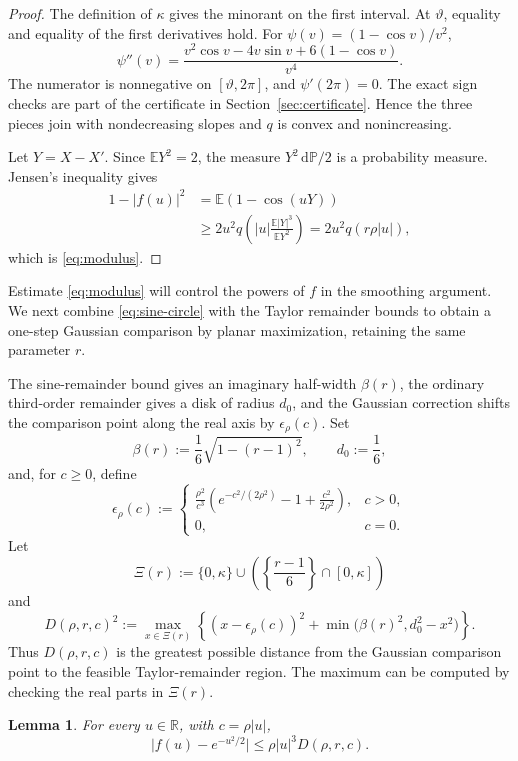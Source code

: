 \documentclass[11pt]{article}
\newtheorem{lemma}[theorem]{Lemma}
\newcommand{\E}{\mathbb E}
\newcommand{\Pp}{\mathbb P}
\newcommand{\R}{\mathbb R}
\newcommand{\dd}{\,\mathrm d}
\newcommand{\abs}[1]{\lvert#1\rvert}
\begin{document}
\begin{proof}
The definition of \(\kappa\) gives the minorant on the first interval.
At \(\vartheta\), equality and equality of the first derivatives hold.
For \(\psi(v)=(1-\cos v)/v^2\),
\[
 \psi''(v)=\frac{v^2\cos v-4v\sin v+6(1-\cos v)}{v^4}.
\]
The numerator is nonnegative on \([\vartheta,2\pi]\), and
\(\psi'(2\pi)=0\).  The exact sign checks are part of the certificate in
Section~\ref{sec:certificate}.  Hence the three pieces join with
nondecreasing slopes and \(q\) is convex and nonincreasing.

Let \(Y=X-X'\).  Since \(\E Y^2=2\), the measure \(Y^2\dd\Pp/2\) is a
probability measure.  Jensen's inequality gives
\begin{align*}
 1-\abs{f(u)}^2
 &=\E(1-\cos(uY))\\
 &\ge2u^2q\left(\abs u\frac{\E\abs Y^3}{\E Y^2}\right)
 =2u^2q(r\rho\abs u),
\end{align*}
which is \eqref{eq:modulus}.
\end{proof}

Estimate \eqref{eq:modulus} will control the powers of \(f\) in the
smoothing argument. We next combine \eqref{eq:sine-circle} with the
Taylor remainder bounds to obtain a one-step Gaussian comparison
by planar maximization, retaining the same parameter \(r\).

The sine-remainder bound gives an
imaginary half-width \(\beta(r)\), the ordinary third-order remainder gives a
disk of radius \(d_0\), and the Gaussian correction shifts the comparison
point along the real axis by \(\epsilon_\rho(c)\).  Set
\[
 \beta(r):=\frac16\sqrt{1-(r-1)^2},\qquad d_0:=\frac16,
\]
and, for \(c\ge0\), define
\[
 \epsilon_\rho(c):=
 \begin{cases}
 \displaystyle\frac{\rho^2}{c^3}
 \left(e^{-c^2/(2\rho^2)}-1+\frac{c^2}{2\rho^2}\right),&c>0,\\[2mm]
 0,&c=0.
 \end{cases}
\]
Let
\[
 \Xi(r):=\{0,\kappa\}\cup
 \left(\left\{\frac{r-1}{6}\right\}\cap[0,\kappa]\right)
\]
and
\[
 D(\rho,r,c)^2:=\max_{x\in\Xi(r)}
 \left\{(x-\epsilon_\rho(c))^2+
 \min\bigl(\beta(r)^2,d_0^2-x^2\bigr)\right\}.
 \label{eq:D-def}\tag{3.3}
\]
Thus \(D(\rho,r,c)\) is the greatest possible distance from the Gaussian
comparison point to the feasible Taylor-remainder region. The maximum can
be computed by checking the real parts in \(\Xi(r)\).

\begin{lemma}\label{lem:one-step}
For every \(u\in\R\), with \(c=\rho\abs u\),
\[
 \abs{f(u)-e^{-u^2/2}}\le\rho\abs u^3D(\rho,r,c).
 \label{eq:one-step}\tag{3.4}
\]
\end{lemma}
\end{document}
